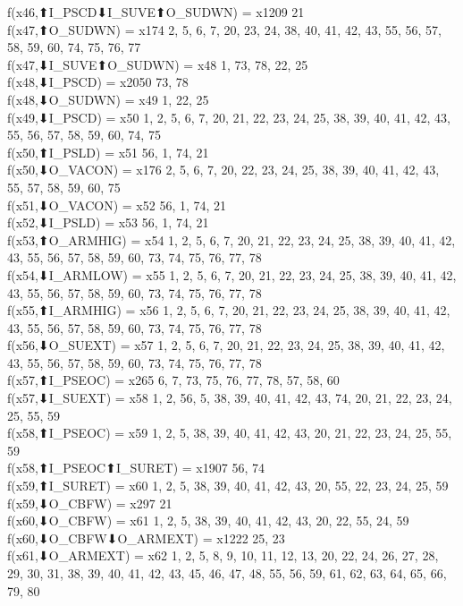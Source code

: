 f(x46,⬆I_PSCD⬇I_SUVE⬆O_SUDWN) = x1209 {21} \\
f(x47,⬆O_SUDWN) = x174 {2, 5, 6, 7, 20, 23, 24, 38, 40, 41, 42, 43, 55, 56, 57, 58, 59, 60, 74, 75, 76, 77} \\
f(x47,⬇I_SUVE⬆O_SUDWN) = x48 {1, 73, 78, 22, 25} \\
f(x48,⬇I_PSCD) = x2050 {73, 78} \\
f(x48,⬇O_SUDWN) = x49 {1, 22, 25} \\
f(x49,⬇I_PSCD) = x50 {1, 2, 5, 6, 7, 20, 21, 22, 23, 24, 25, 38, 39, 40, 41, 42, 43, 55, 56, 57, 58, 59, 60, 74, 75} \\
f(x50,⬆I_PSLD) = x51 {56, 1, 74, 21} \\
f(x50,⬇O_VACON) = x176 {2, 5, 6, 7, 20, 22, 23, 24, 25, 38, 39, 40, 41, 42, 43, 55, 57, 58, 59, 60, 75} \\
f(x51,⬇O_VACON) = x52 {56, 1, 74, 21} \\
f(x52,⬇I_PSLD) = x53 {56, 1, 74, 21} \\
f(x53,⬆O_ARMHIG) = x54 {1, 2, 5, 6, 7, 20, 21, 22, 23, 24, 25, 38, 39, 40, 41, 42, 43, 55, 56, 57, 58, 59, 60, 73, 74, 75, 76, 77, 78} \\
f(x54,⬇I_ARMLOW) = x55 {1, 2, 5, 6, 7, 20, 21, 22, 23, 24, 25, 38, 39, 40, 41, 42, 43, 55, 56, 57, 58, 59, 60, 73, 74, 75, 76, 77, 78} \\
f(x55,⬆I_ARMHIG) = x56 {1, 2, 5, 6, 7, 20, 21, 22, 23, 24, 25, 38, 39, 40, 41, 42, 43, 55, 56, 57, 58, 59, 60, 73, 74, 75, 76, 77, 78} \\
f(x56,⬇O_SUEXT) = x57 {1, 2, 5, 6, 7, 20, 21, 22, 23, 24, 25, 38, 39, 40, 41, 42, 43, 55, 56, 57, 58, 59, 60, 73, 74, 75, 76, 77, 78} \\
f(x57,⬆I_PSEOC) = x265 {6, 7, 73, 75, 76, 77, 78, 57, 58, 60} \\
f(x57,⬇I_SUEXT) = x58 {1, 2, 56, 5, 38, 39, 40, 41, 42, 43, 74, 20, 21, 22, 23, 24, 25, 55, 59} \\
f(x58,⬆I_PSEOC) = x59 {1, 2, 5, 38, 39, 40, 41, 42, 43, 20, 21, 22, 23, 24, 25, 55, 59} \\
f(x58,⬆I_PSEOC⬆I_SURET) = x1907 {56, 74} \\
f(x59,⬆I_SURET) = x60 {1, 2, 5, 38, 39, 40, 41, 42, 43, 20, 55, 22, 23, 24, 25, 59} \\
f(x59,⬇O_CBFW) = x297 {21} \\
f(x60,⬇O_CBFW) = x61 {1, 2, 5, 38, 39, 40, 41, 42, 43, 20, 22, 55, 24, 59} \\
f(x60,⬇O_CBFW⬇O_ARMEXT) = x1222 {25, 23} \\
f(x61,⬇O_ARMEXT) = x62 {1, 2, 5, 8, 9, 10, 11, 12, 13, 20, 22, 24, 26, 27, 28, 29, 30, 31, 38, 39, 40, 41, 42, 43, 45, 46, 47, 48, 55, 56, 59, 61, 62, 63, 64, 65, 66, 79, 80} \\
